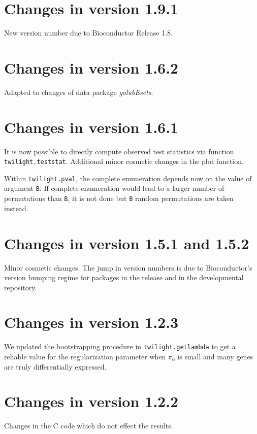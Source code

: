 \documentclass[11pt,a4paper,fleqn]{report}
\newcommand{\Rfunction}[1]{{\texttt{#1}}}
\newcommand{\Rpackage}[1]{{\textit{#1}}}
\newcommand{\Rfunarg}[1]{{\texttt{#1}}}
\begin{document}
\section*{Changes in version 1.9.1}

New version number due to Bioconductor Release 1.8.


\section*{Changes in version 1.6.2}

Adapted to changes of data package \Rpackage{golubEsets}.


\section*{Changes in version 1.6.1}

It is now possible to directly compute observed test statistics via function \Rfunction{twilight.teststat}. Additional minor cosmetic changes in the plot function. 

Within \Rfunction{twilight.pval}, the complete enumeration depends now on the value of argument \Rfunarg{B}. If complete enumeration would lead to a larger number of permutations than \Rfunarg{B}, it is not done but \Rfunarg{B} random permutations are taken instead.


\section*{Changes in version 1.5.1 and 1.5.2}

Minor cosmetic changes. The jump in version numbers is due to Bioconductor's version bumping regime for packages in the release and in the developmental repository.


\section*{Changes in version 1.2.3}

We updated the bootstrapping procedure in \Rfunction{twilight.getlambda} to get a reliable value for the regularization parameter when $\pi_0$ is small and many genes are truly differentially expressed.


\section*{Changes in version 1.2.2}

Changes in the C code which do not effect the results.
\end{document}
